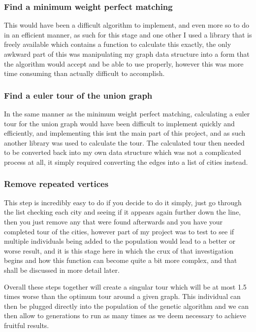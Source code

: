 \documentclass[11pt,a4paper,titlepage]{article}
\begin{document}
\subsubsection{Find a minimum weight perfect matching}
This would have been a difficult algorithm to implement, and even more so to do in an efficient manner, as such for this stage and one other I used a library that is freely available \cite{KolMinMatch} which contains a function to calculate this exactly, the only awkward part of this was manipulating my graph data structure into a form that the algorithm would accept and be able to use properly, however this was more time consuming than actually difficult to accomplish.

\subsubsection{Find a euler tour of the union graph}
In the same manner as the minimum weight perfect matching, calculating a euler tour for the union graph would have been difficult to implement quickly and efficiently, and implementing this isnt the main part of this project, and as such another library was used \cite{HeirEulTour} to calculate the tour. The calculated tour then needed to be converted back into my own data structure which was not a complicated process at all, it simply required converting the edges into a list of cities instead.

\subsubsection{Remove repeated vertices}
This step is incredibly easy to do if you decide to do it simply, just go through the list checking each city and seeing if it appears again further down the line, then you just remove any that were found afterwards and you have your completed tour of the cities, however part of my project was to test to see if multiple individuals being added to the population would lead to a better or worse result, and it is this stage here in which the crux of that investigation begins and how this function can become quite a bit more complex, and that shall be discussed in more detail later.

Overall these steps together will create a singular tour which will be at most 1.5 times worse than the optimum tour around a given graph. This individual can then be plugged directly into the population of the genetic algorithm and we can then allow to generations to run as many times as we deem necessary to achieve fruitful results.
\end{document}
